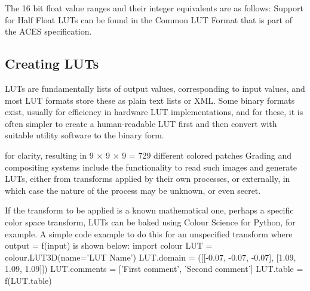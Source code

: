 The 16 bit float value ranges and their integer equivalents are as follows:
Support for Half Float LUTs can be found in the Common LUT Format that is part of the ACES specification.

\subsection{Creating LUTs}%
\label{subsec:creating-luts}

LUTs are fundamentally lists of output values, corresponding to input values, and most LUT formats store these as plain text lists or XML. Some binary formats exist, usually for efficiency in hardware LUT implementations, and for these, it is often simpler to create a human-readable LUT first and then convert with suitable utility software to the binary form.

for clarity, resulting in 9 × 9 × 9 = 729 different colored patches
Grading and compositing systems include the functionality to read such images and generate LUTs, either from transforms applied by their own processes, or externally, in which case the nature of the process may be unknown, or even secret.

If the transform to be applied is a known mathematical one, perhaps a specific color space transform, LUTs can be baked using Colour Science for Python, for example. A simple code example to do this for an unspecified transform where output = f(input) is shown below:
import colour
LUT = colour.LUT3D(name='LUT Name')
LUT.domain = ([[-0.07, -0.07, -0.07], [1.09, 1.09, 1.09]])
LUT.comments = ['First comment', 'Second comment']
LUT.table = f(LUT.table)

